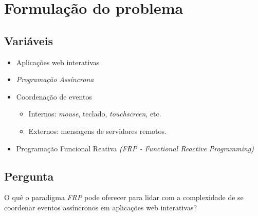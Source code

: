 \section{Formulação do problema}\label{lproblema}

\subsection{Variáveis}

\begin{itemize}[noitemsep]
  \item Aplicações web interativas
  \item \emph{Programação Assíncrona}
  \item Coordenação de eventos
    \begin{itemize}[noitemsep]
      \item Internos: \emph{mouse}, teclado, \emph{touchscreen}, etc.
      \item Externos: mensagens de servidores remotos.
    \end{itemize}
  \item Programação Funcional Reativa \emph{(FRP - Functional Reactive Programming)}
\end{itemize}


\subsection{Pergunta}

O quê o paradigma \emph{FRP}
pode oferecer para lidar com a complexidade de se coordenar
eventos assíncronos em aplicações web interativas?


